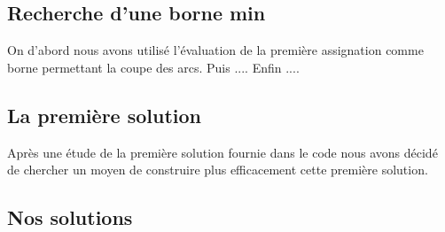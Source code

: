 \documentclass[french]{article}
\begin{document}
	\subsection{Recherche d'une borne min}
	On d'abord nous avons utilisé l'évaluation de la première assignation comme borne permettant la coupe des arcs.
	Puis ....
	Enfin ....
	
	\subsection{La première solution}
	Après une étude de la première solution fournie dans le code nous avons décidé de chercher un moyen de construire plus efficacement cette première solution.
	
	\subsection{Nos solutions}
	
\end{document}
